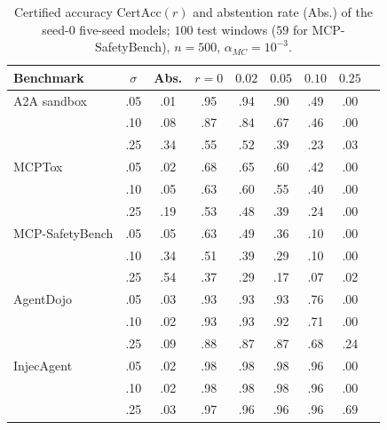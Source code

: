 \documentclass[conference,compsoc]{IEEEtran}
\begin{document}
\begin{table}[!tbp]
\centering
\caption{Certified accuracy $\mathrm{CertAcc}(r)$ and abstention rate (Abs.) of the seed-0 five-seed models; $100$ test windows ($59$ for MCP-SafetyBench), $n=500$, $\alpha_{MC}=10^{-3}$.}
\label{tab:certfull}
\scriptsize
\renewcommand{\arraystretch}{1.05}
\setlength{\tabcolsep}{2.6pt}
\begin{tabular}{@{}lcccccccc@{}}
\toprule
\textbf{Benchmark} & $\sigma$ & \textbf{Abs.} & $r{=}0$ & $0.02$ & $0.05$ & $0.10$ & $0.25$ \\
\midrule
A2A sandbox & .05 & .01 & .95 & .94 & .90 & .49 & .00 \\
            & .10 & .08 & .87 & .84 & .67 & .46 & .00 \\
            & .25 & .34 & .55 & .52 & .39 & .23 & .03 \\
MCPTox      & .05 & .02 & .68 & .65 & .60 & .42 & .00 \\
            & .10 & .05 & .63 & .60 & .55 & .40 & .00 \\
            & .25 & .19 & .53 & .48 & .39 & .24 & .00 \\
MCP-SafetyBench & .05 & .05 & .63 & .49 & .36 & .10 & .00 \\
            & .10 & .34 & .51 & .39 & .29 & .10 & .00 \\
            & .25 & .54 & .37 & .29 & .17 & .07 & .02 \\
AgentDojo   & .05 & .03 & .93 & .93 & .93 & .76 & .00 \\
            & .10 & .02 & .93 & .93 & .92 & .71 & .00 \\
            & .25 & .09 & .88 & .87 & .87 & .68 & .24 \\
InjecAgent  & .05 & .02 & .98 & .98 & .98 & .96 & .00 \\
            & .10 & .02 & .98 & .98 & .98 & .96 & .00 \\
            & .25 & .03 & .97 & .96 & .96 & .96 & .69 \\
\bottomrule
\end{tabular}
\end{table}
\end{document}
